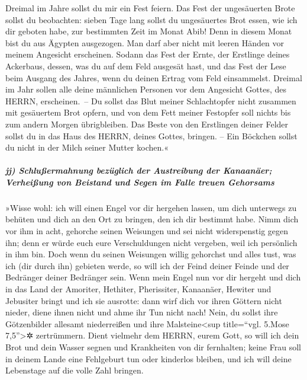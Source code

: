  Dreimal im Jahre sollst du mir ein Fest feiern.
 Das Fest der ungesäuerten Brote sollst du beobachten:
sieben Tage lang sollst du ungesäuertes Brot essen, wie ich dir geboten
habe, zur bestimmten Zeit im Monat Abib! Denn in diesem Monat bist du
aus Ägypten ausgezogen. Man darf aber nicht mit leeren Händen vor meinem
Angesicht erscheinen.  Sodann das Fest der Ernte, der
Erstlinge deines Ackerbaus, dessen, was du auf dem Feld ausgesät hast,
und das Fest der Lese beim Ausgang des Jahres, wenn du deinen Ertrag vom
Feld einsammelst.  Dreimal im Jahr sollen alle deine
männlichen Personen vor dem Angesicht Gottes, des HERRN, erscheinen.~--
 Du sollst das Blut meiner Schlachtopfer nicht zusammen
mit gesäuertem Brot opfern, und von dem Fett meiner Festopfer soll
nichts bis zum andern Morgen übrigbleiben.  Das Beste von
den Erstlingen deiner Felder sollst du in das Haus des HERRN, deines
Gottes, bringen. -- Ein Böckchen sollst du nicht in der Milch seiner
Mutter kochen.«

\hypertarget{jj-schluuxdfermahnung-bezuxfcglich-der-austreibung-der-kanaanuxe4er-verheiuxdfung-von-beistand-und-segen-im-falle-treuen-gehorsams}{%
\subparagraph{jj) Schlußermahnung bezüglich der Austreibung der
Kanaanäer; Verheißung von Beistand und Segen im Falle treuen
Gehorsams}\label{jj-schluuxdfermahnung-bezuxfcglich-der-austreibung-der-kanaanuxe4er-verheiuxdfung-von-beistand-und-segen-im-falle-treuen-gehorsams}}

 »Wisse wohl: ich will einen Engel vor dir hergehen
lassen, um dich unterwegs zu behüten und dich an den Ort zu bringen, den
ich dir bestimmt habe.  Nimm dich vor ihm in acht,
gehorche seinen Weisungen und sei nicht widerspenstig gegen ihn; denn er
würde euch eure Verschuldungen nicht vergeben, weil ich persönlich in
ihm bin.  Doch wenn du seinen Weisungen willig gehorchst
und alles tust, was ich (dir durch ihn) gebieten werde, so will ich der
Feind deiner Feinde und der Bedränger deiner Bedränger sein.
 Wenn mein Engel nun vor dir hergeht und dich in das Land
der Amoriter, Hethiter, Pherissiter, Kanaanäer, Hewiter und Jebusiter
bringt und ich sie ausrotte:  dann wirf dich vor ihren
Göttern nicht nieder, diene ihnen nicht und ahme ihr Tun nicht nach!
Nein, du sollst ihre Götzenbilder allesamt niederreißen und ihre
Malsteine\textless sup title=``vgl. 5.Mose 7,5''\textgreater✲
zertrümmern.  Dient vielmehr dem HERRN, eurem Gott, so
will ich dein Brot und dein Wasser segnen und Krankheiten von dir
fernhalten;  keine Frau soll in deinem Lande eine
Fehlgeburt tun oder kinderlos bleiben, und ich will deine Lebenstage auf
die volle Zahl bringen.

